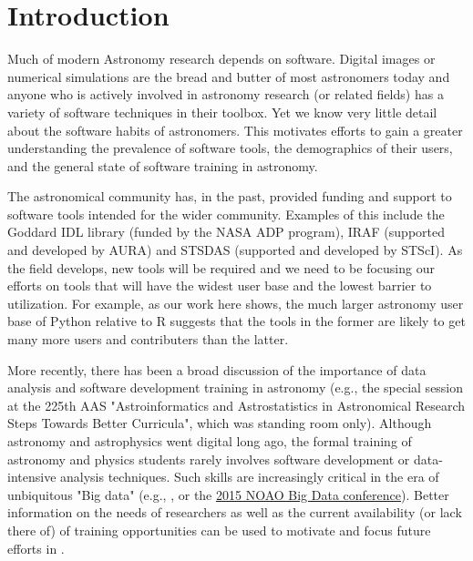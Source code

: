 \section{Introduction}

Much of modern Astronomy research depends on software. Digital images or numerical simulations are the bread and butter of most astronomers today and anyone who is actively involved in astronomy research (or related fields) has a variety of software techniques in their toolbox. Yet we know very little detail about the software habits of astronomers. This motivates efforts to gain a greater understanding the prevalence of software tools, the demographics of their users, and the general state of software training in astronomy.

The astronomical community has, in the past, provided funding and support to software tools intended for the wider community. Examples of this include the Goddard IDL library (funded by the NASA ADP program), IRAF (supported and developed by AURA) and STSDAS (supported and developed by STScI). As the field develops, new tools will be required and we need to be focusing our efforts on tools that will have the widest user base and the lowest barrier to utilization. For example, as our work here shows, the much larger astronomy user base of Python relative to R suggests that the tools in the former are likely to get many more users and contributers than the latter. 

More recently, there has been a broad discussion of the importance of data analysis and software development training in astronomy (e.g., the special session at the 225th AAS "Astroinformatics and Astrostatistics in Astronomical Research Steps Towards Better Curricula", which was standing room only). Although astronomy and astrophysics went digital long ago, the formal training of astronomy and physics students rarely involves software development or data-intensive analysis techniques. Such skills are increasingly critical in the era of unbiquitous "Big data" (e.g., \citealt{Berriman_2011}, or the \href{http://www.noao.edu/meetings/bigdata/}{2015 NOAO Big Data conference}). Better information on the needs of researchers as well as the current availability (or lack there of) of training opportunities can be used to motivate and focus future efforts in . 




